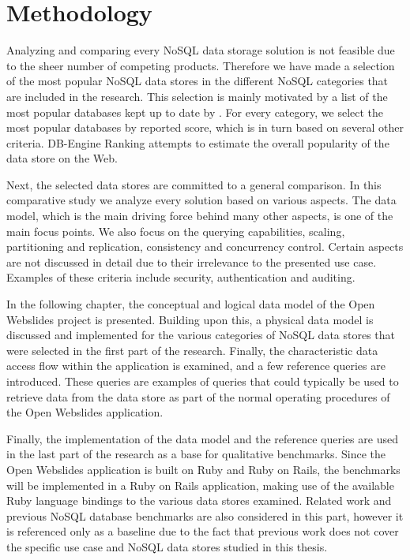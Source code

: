 
\chapter{Methodology}
\label{ch:methodology}

Analyzing and comparing every NoSQL data storage solution is not feasible due to the sheer number of competing products. Therefore we have made a selection of the most popular NoSQL data stores in the different NoSQL categories that are included in the research. This selection is mainly motivated by a list of the most popular databases kept up to date by \textcite{DBEngine2018}. For every category, we select the most popular databases by reported score, which is in turn based on several other criteria. DB-Engine Ranking attempts to estimate the overall popularity of the data store on the Web.

Next, the selected data stores are committed to a general comparison. In this comparative study we analyze every solution based on various aspects. The data model, which is the main driving force behind many other aspects, is one of the main focus points. We also focus on the querying capabilities, scaling, partitioning and replication, consistency and concurrency control. Certain aspects are not discussed in detail due to their irrelevance to the presented use case. Examples of these criteria include security, authentication and auditing.

In the following chapter, the conceptual and logical data model of the Open Webslides project is presented. Building upon this, a physical data model is discussed and implemented for the various categories of NoSQL data stores that were selected in the first part of the research. Finally, the characteristic data access flow within the application is examined, and a few reference queries are introduced. These queries are examples of queries that could typically be used to retrieve data from the data store as part of the normal operating procedures of the Open Webslides application.

Finally, the implementation of the data model and the reference queries are used in the last part of the research as a base for qualitative benchmarks. Since the Open Webslides application is built on Ruby and Ruby on Rails, the benchmarks will be implemented in a Ruby on Rails application, making use of the available Ruby language bindings to the various data stores examined. Related work and previous NoSQL database benchmarks are also considered in this part, however it is referenced only as a baseline due to the fact that previous work does not cover the specific use case and NoSQL data stores studied in this thesis.
